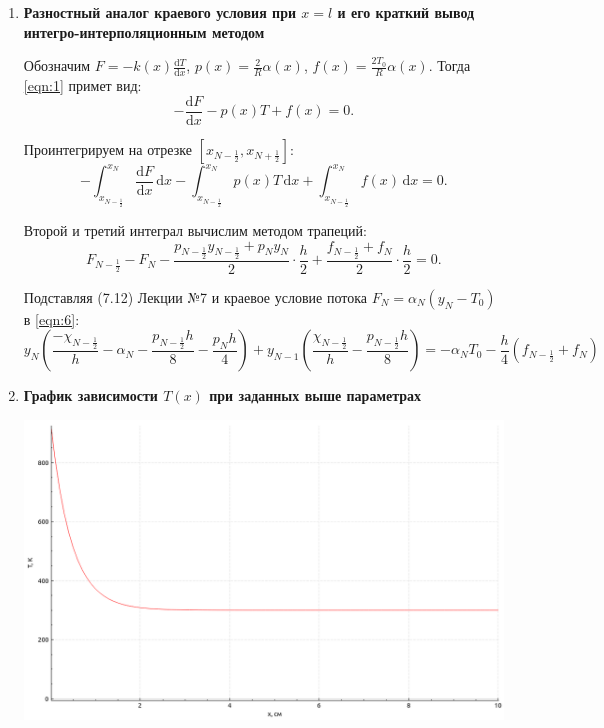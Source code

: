 \documentclass[a4paper,oneside,12pt]{extreport}
\begin{document}
\begin{enumerate}
	\item \textbf{Разностный аналог краевого условия при $x=l$ и его краткий вывод интегро-интерполяционным методом}

	Обозначим $\displaystyle F=-k(x)\frac{\mathrm dT}{\mathrm dx}$, $\displaystyle p(x)=\frac2R\alpha(x)$, $\displaystyle f(x)=\frac{2T_0}R\alpha(x)$.
	Тогда \eqref{eqn:1} примет вид:
	\begin{equation}
		-\frac{\mathrm dF}{\mathrm dx}-p(x)T+f(x)=0.
	\end{equation}

	Проинтегрируем на отрезке $[x_{N-\frac12}, x_{N+\frac12}]$:
	\begin{equation}
		-\int_{x_{N-\frac12}}^{x_N} \frac{\mathrm dF}{\mathrm dx}\,\mathrm dx
		-\int_{x_{N-\frac12}}^{x_N} p(x)T\,\mathrm dx
		+\int_{x_{N-\frac12}}^{x_N} f(x)\,\mathrm dx
		=0.
	\end{equation}

	Второй и третий интеграл вычислим методом трапеций:
	\begin{equation}
		F_{N-\frac12}-F_N
		-\frac{p_{N-\frac12}y_{N-\frac12}+p_Ny_N}2\cdot\frac h2
		+\frac{f_{N-\frac12}+f_N}2\cdot\frac h2
		=0.
		\label{eqn:6}
	\end{equation}

	Подставляя (7.12) Лекции №7 и краевое условие потока $F_N=\alpha_N(y_N-T_0)$ в \eqref{eqn:6}:
	\begin{equation}
		y_N\left(\frac{-\chi_{N-\frac12}}h-\alpha_N-\frac{p_{N-\frac12}h}8-\frac{p_Nh}4\right)
		+y_{N-1}\left(\frac{\chi_{N-\frac12}}h-\frac{p_{N-\frac12}h}8\right)
		=-\alpha_NT_0-\frac h4\left(f_{N-\frac12}+f_N\right)
	\end{equation}


	\item \textbf{График зависимости $T(x)$ при заданных выше параметрах}

	\includegraphics[width=\linewidth]{inc/img/graph1}



\end{enumerate}
\end{document}
